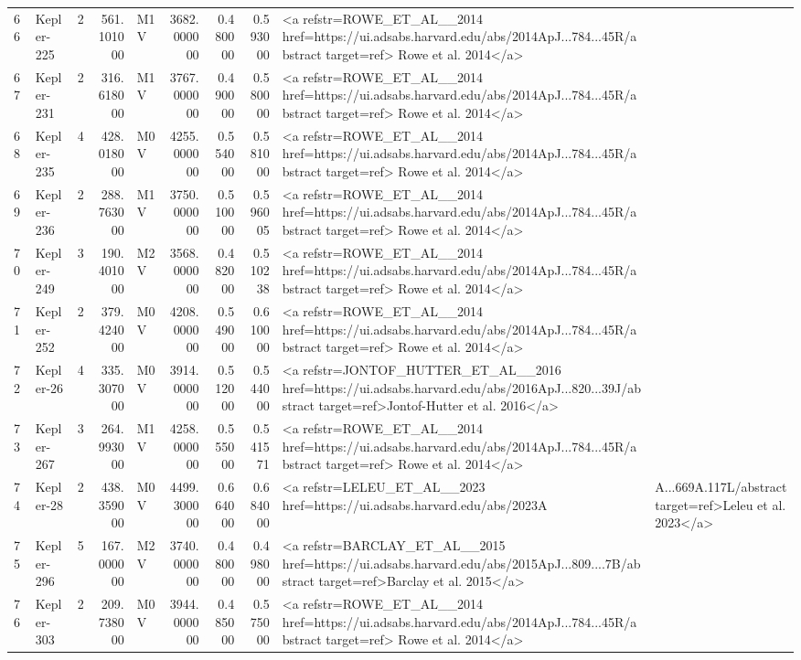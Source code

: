 \begin{tabular}{llrrlrrrl}
66 & Kepler-225 & 2 & 561.101000 & M1 V & 3682.000000 & 0.480000 & 0.593000 & <a refstr=ROWE_ET_AL__2014 href=https://ui.adsabs.harvard.edu/abs/2014ApJ...784...45R/abstract target=ref> Rowe et al. 2014</a> \\
67 & Kepler-231 & 2 & 316.618000 & M1 V & 3767.000000 & 0.490000 & 0.580000 & <a refstr=ROWE_ET_AL__2014 href=https://ui.adsabs.harvard.edu/abs/2014ApJ...784...45R/abstract target=ref> Rowe et al. 2014</a> \\
68 & Kepler-235 & 4 & 428.018000 & M0 V & 4255.000000 & 0.554000 & 0.581000 & <a refstr=ROWE_ET_AL__2014 href=https://ui.adsabs.harvard.edu/abs/2014ApJ...784...45R/abstract target=ref> Rowe et al. 2014</a> \\
69 & Kepler-236 & 2 & 288.763000 & M1 V & 3750.000000 & 0.510000 & 0.596005 & <a refstr=ROWE_ET_AL__2014 href=https://ui.adsabs.harvard.edu/abs/2014ApJ...784...45R/abstract target=ref> Rowe et al. 2014</a> \\
70 & Kepler-249 & 3 & 190.401000 & M2 V & 3568.000000 & 0.482000 & 0.510238 & <a refstr=ROWE_ET_AL__2014 href=https://ui.adsabs.harvard.edu/abs/2014ApJ...784...45R/abstract target=ref> Rowe et al. 2014</a> \\
71 & Kepler-252 & 2 & 379.424000 & M0 V & 4208.000000 & 0.549000 & 0.610000 & <a refstr=ROWE_ET_AL__2014 href=https://ui.adsabs.harvard.edu/abs/2014ApJ...784...45R/abstract target=ref> Rowe et al. 2014</a> \\
72 & Kepler-26 & 4 & 335.307000 & M0 V & 3914.000000 & 0.512000 & 0.544000 & <a refstr=JONTOF_HUTTER_ET_AL__2016 href=https://ui.adsabs.harvard.edu/abs/2016ApJ...820...39J/abstract target=ref>Jontof-Hutter et al. 2016</a> \\
73 & Kepler-267 & 3 & 264.993000 & M1 V & 4258.000000 & 0.555000 & 0.541571 & <a refstr=ROWE_ET_AL__2014 href=https://ui.adsabs.harvard.edu/abs/2014ApJ...784...45R/abstract target=ref> Rowe et al. 2014</a> \\
74 & Kepler-28 & 2 & 438.359000 & M0 V & 4499.300000 & 0.664000 & 0.684000 & <a refstr=LELEU_ET_AL__2023 href=https://ui.adsabs.harvard.edu/abs/2023A&A...669A.117L/abstract target=ref>Leleu et al. 2023</a> \\
75 & Kepler-296 & 5 & 167.000000 & M2 V & 3740.000000 & 0.480000 & 0.498000 & <a refstr=BARCLAY_ET_AL__2015 href=https://ui.adsabs.harvard.edu/abs/2015ApJ...809....7B/abstract target=ref>Barclay et al. 2015</a> \\
76 & Kepler-303 & 2 & 209.738000 & M0 V & 3944.000000 & 0.485000 & 0.575000 & <a refstr=ROWE_ET_AL__2014 href=https://ui.adsabs.harvard.edu/abs/2014ApJ...784...45R/abstract target=ref> Rowe et al. 2014</a> \\

\end{tabular}

